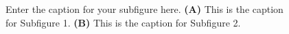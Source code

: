 \documentclass[utf8]{FrontiersinHarvard} %
\renewcommand*{\|}[1][]{\nonscript\:#1\vert\nonscript\:\mathopen{}}
\begin{document}
\begin{subfigure}
\setcounter{figure}{2}
\setcounter{subfigure}{-1}
    \caption{Enter the caption for your subfigure here. \textbf{(A)} This is the caption for Subfigure 1. \textbf{(B)} This is the caption for Subfigure 2.}
    \label{fig: subfigures}
\end{subfigure}

\end{document}
